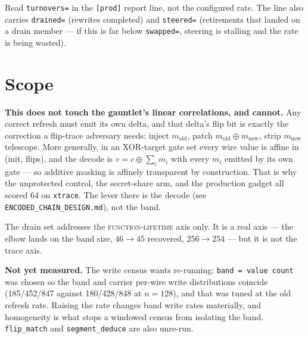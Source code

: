 \documentclass[11pt]{article}
\newcommand{\XOR}{\oplus}
\begin{document}
\medskip\noindent
Read \texttt{turnovers=} in the \texttt{[prod]} report line, not the configured
rate. The line also carries \texttt{drained=} (rewrites completed) and
\texttt{steered=} (retirements that landed on a drain member --- if this is far
below \texttt{swapped=}, steering is stalling and the rate is being wasted).

\section{Scope}

\textbf{This does not touch the gauntlet's linear correlations, and cannot.}
Any correct refresh must emit its own delta, and that delta's flip bit is
exactly the correction a flip-trace adversary needs: inject $m_{\mathrm{old}}$,
patch $m_{\mathrm{old}} \XOR m_{\mathrm{new}}$, strip $m_{\mathrm{new}}$
telescope. More generally, in an XOR-target gate set every wire value is affine
in (init, flips), and the decode is $v = c \XOR \sum_i m_i$ with every $m_i$
emitted by its own gate --- so additive masking is affinely transparent by
construction. That is why the unprotected control, the secret-share arm, and
the production gadget all scored 64 on \texttt{xtrace}. The lever there is the
decode (see \texttt{ENCODED\_CHAIN\_DESIGN.md}), not the band.

The drain set addresses the \textsc{function-lifetime} axis only. It is a real
axis --- the elbow lands on the band size, $46 \to 45$ recovered,
$256 \to 254$ --- but it is not the trace axis.

\medskip\noindent
\textbf{Not yet measured.} The write census wants re-running:
\texttt{band = value count} was chosen so the band and carrier per-wire write
distributions coincide (185/452/847 against 180/428/848 at $n=128$), and that
was tuned at the old refresh rate. Raising the rate changes band write rates
materially, and homogeneity is what stops a windowed census from isolating the
band. \texttt{flip\_match} and \texttt{segment\_deduce} are also unre-run.
\end{document}
